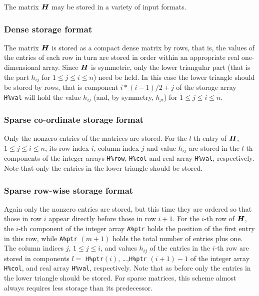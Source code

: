 \documentclass{galahad}
\begin{document}
\galmatrix
The matrix ${\bm{H}}$ may be stored in a variety of input formats.

\subsubsection{Dense storage format}\label{dense}
The matrix ${\bm{H}}$ is stored as a compact
dense matrix by rows, that is, the values of the entries of each row in turn are
stored in order within an appropriate real one-dimensional array.
Since ${\bm{H}}$ is symmetric, only the lower triangular part (that is the part
$h_{ij}$ for $1 \leq j \leq i \leq n$) need be held. In this case
the lower triangle should be stored by rows, that is
component $i \ast (i-1)/2 + j$ of the storage array {\tt H\%val}
will hold the value $h_{ij}$ (and, by symmetry, $h_{ji}$)
for $1 \leq j \leq i \leq n$.

\subsubsection{Sparse co-ordinate storage format}\label{coordinate}
Only the nonzero entries of the matrices are stored.
For the $l$-th entry of ${\bm{H}}$, $1 \leq j \leq i \leq n$,
its row index $i$, column index $j$ and value $h_{ij}$
are stored in the $l$-th components of the integer arrays {\tt H\%row},
{\tt H\%col} and real array {\tt H\%val}, respectively.
Note that only the entries in the lower triangle should be stored.

\subsubsection{Sparse row-wise storage format}\label{rowwise}
Again only the nonzero entries are stored, but this time
they are ordered so that those in row $i$ appear directly before those
in row $i+1$. For the $i$-th row of ${\bm{H}}$, the $i$-th component of the
integer array {\tt A\%ptr} holds the position of the first entry in this row,
while {\tt A\%ptr} $(m+1)$ holds the total number of entries plus one.
The column indices $j$, $1 \leq j \leq i$, and values $h_{ij}$ of the
entries in the $i$-th row are stored in components
$l =$ {\tt H\%ptr}$(i)$, \ldots ,{\tt H\%ptr} $(i+1)-1$ of the
integer array {\tt H\%col}, and real array {\tt H\%val}, respectively.
Note that as before only the entries in the lower triangle should be stored.
For sparse matrices, this scheme almost always requires less storage than
its predecessor.

\end{document}
